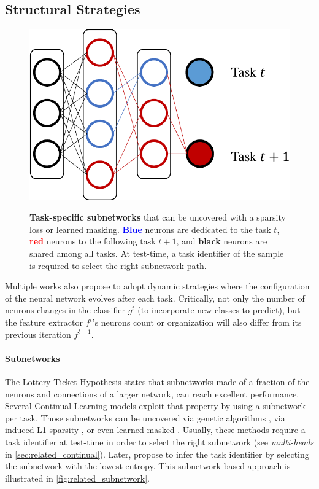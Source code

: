 \subsection{Structural Strategies}
\label{sec:related_structural}

\begin{figure}[tb]
      \begin{center}
            {\includegraphics[width=0.5\linewidth]{images/related/subnetworks.pdf}}
      \end{center}
      \caption{\textbf{Task-specific subnetworks} that can be uncovered with a sparsity loss or
            learned masking. \textcolor{blue}{\textbf{Blue}} neurons are dedicated to
            the task $t$, \textcolor{red}{\textbf{red}} neurons to the following task
            $t+1$, and \textbf{black} neurons are shared among all tasks. At
            test-time, a task identifier of the sample is required to select the
            right subnetwork path.}
      \label{fig:related_subnetwork}
\end{figure}

Multiple works also propose to adopt dynamic strategies where the configuration of the neural
network evolves after each task. Critically, not only the number of neurons changes in the classifier $g^t$
(to incorporate new classes to predict), but the feature extractor $f^t$'s neurons count or organization
will also differ from its previous iteration $f^{t-1}$.


\paragraph{Subnetworks} The Lottery Ticket Hypothesis \citep{frankle2019lottery_ticket} states that
subnetworks made of a fraction of the neurons and connections of a larger network, can reach
excellent performance. Several Continual Learning models exploit that property by using a
subnetwork per task. Those subnetworks can be uncovered via genetic algorithms
\citep{fernando2017path_net}, via induced L1 sparsity \citep{golkar2019neural_pruning}, or even
learned masked \citet{serra2018hat,hung2019cpg}. Usually, these methods require a task identifier at
test-time in order to select the right subnetwork (see \textit{multi-heads} in
\autoref{sec:related_continual}). Later, \citet{wortsman2020supermasks} propose to infer the task
identifier by selecting the subnetwork with the lowest entropy. This subnetwork-based approach is
illustrated in \autoref{fig:related_subnetwork}.

